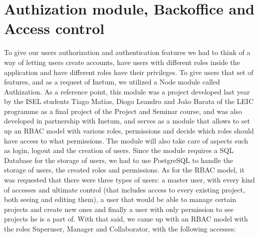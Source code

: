 \documentclass[a4paper,twoside,10pt]{report}
\begin{document}
\section{Authization module, Backoffice and Access control}
 To give our users authorization and authentication features we had to think of a way of letting users create accounts, have users with different roles inside the application and have different roles have their privileges. To give users that set of features, and as a request of Inetum, we utilized a Node module called Authization\cite{AUTHIZATION}. 
\newline
As a reference point, this module was a project developed last year by the ISEL students Tiago Matias, Diogo Leandro and João Barata of the LEIC programme as a final project of the Project and Seminar course, and was also developed in partnership with Inetum, and serves as a module that allows to set up an RBAC model with various roles, permissions and decide which roles should have access to what permissions. The module will also take care of aspects such as login, logout and the creation of users. Since the module requires a SQL Database for the storage of users, we had to use  PostgreSQL\cite{POSTGRESQL} to handle the storage of users, the created roles and permissions.
\newline
As for the RBAC model, it was requested that there were three types of users: a master user, with every kind of accesses and ultimate control (that includes access to every existing project, both seeing and editing them), a user that would be able to manage certain projects and create new ones and finally a user with only permission to see projects he is a part of.
With that said, we came up with an RBAC model with the roles Superuser, Manager and Collaborator, with the following accesses:
\\ \newline
\end{document}
